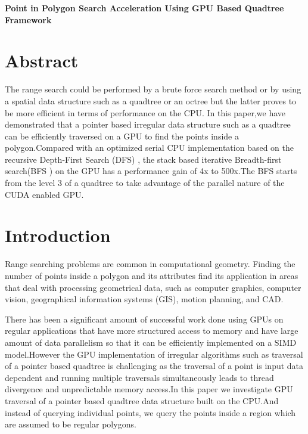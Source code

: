 \documentclass{article}
\begin{document}
\begin{titlepage}
   \begin{center}
      \Large\textbf{Point in Polygon Search Acceleration Using GPU Based Quadtree Framework}
   \end{center}
\end{titlepage}


\section{Abstract}

The range search could be performed by a brute force search method or by using a spatial data structure such as a quadtree or an octree but the latter proves to be more efficient in terms of performance on the CPU. 
In this paper,we have demonstrated that a pointer based irregular data structure such as a quadtree can be efficiently traversed on a GPU to find the points inside a polygon.Compared with an optimized serial CPU implementation based on the  recursive Depth-First Search (DFS) , the stack based iterative Breadth-first search(BFS ) on the GPU  has a performance gain of 4x to 500x.The BFS starts from the level 3 of a quadtree to take advantage of the parallel nature of the CUDA enabled GPU.

\section{Introduction}
Range searching problems are common in computational geometry. Finding the number of points inside a polygon and its attributes find its application in areas that deal with processing geometrical data, such as computer graphics, computer vision, geographical information systems (GIS), motion planning, and CAD. 

There has been a significant amount of successful work done using GPUs on regular applications that have more structured access to memory and have  large amount of data parallelism so that it can be efficiently implemented on a SIMD model.However the GPU implementation of irregular algorithms such as traversal of a pointer based quadtree is challenging as the traversal of a point is input data dependent and running multiple traversals simultaneously leads to thread divergence and unpredictable memory access.In this paper we investigate GPU traversal of a pointer based quadtree data structure built on the CPU.And instead of querying individual points, we query the points inside a region which are assumed to be regular polygons.
\end{document}
